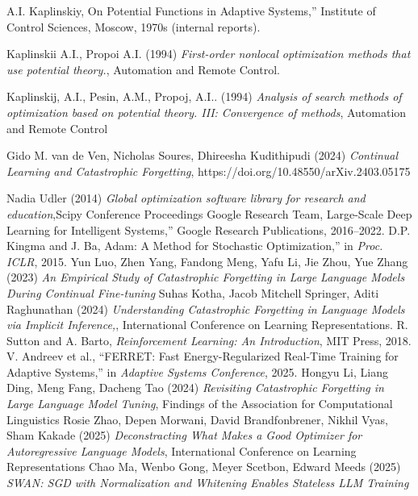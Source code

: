\documentclass[12pt]{article}
\begin{document}
 \begin{thebibliography}{9}

 A.I. Kaplinskiy, On Potential Functions in Adaptive Systems,'' Institute of Control Sciences, Moscow, 1970s (internal reports).


Kaplinskii A.I., Propoi A.I. (1994) \emph{First-order nonlocal optimization methods that use potential theory.}, Automation and Remote Control. 

Kaplinskij, A.I., Pesin, A.M., Propoj, A.I.. (1994) \emph{  Analysis of search methods of optimization based on potential theory. III: Convergence of methods}, Automation and Remote Control

Gido M. van de Ven, Nicholas Soures, Dhireesha Kudithipudi (2024)  \emph{  Continual Learning and Catastrophic Forgetting},
https://doi.org/10.48550/arXiv.2403.05175

Nadia Udler (2014) \emph{ Global optimization software library for research and education},Scipy Conference Proceedings
 Google Research Team, Large-Scale Deep Learning for Intelligent Systems,'' Google Research Publications, 2016--2022.
 D.P. Kingma and J. Ba, Adam: A Method for Stochastic Optimization,'' in \emph{Proc. ICLR}, 2015.
 Yun Luo, Zhen Yang, Fandong Meng, Yafu Li, Jie Zhou, Yue Zhang (2023) \emph{An Empirical Study of Catastrophic Forgetting in Large Language Models During Continual Fine-tuning}
  Suhas Kotha, Jacob Mitchell Springer, Aditi Raghunathan (2024) \emph{Understanding Catastrophic Forgetting in Language Models via Implicit Inference,},  International Conference on Learning Representations.
 R. Sutton and A. Barto, \emph{Reinforcement Learning: An Introduction}, MIT Press, 2018.
 V. Andreev et al., ``FERRET: Fast Energy-Regularized Real-Time Training for Adaptive Systems,'' in \emph{Adaptive Systems Conference}, 2025.
 Hongyu Li, Liang Ding, Meng Fang, Dacheng Tao  (2024)  \emph{ Revisiting Catastrophic Forgetting in Large Language Model Tuning}, Findings of the Association for Computational Linguistics
 Rosie Zhao, Depen Morwani, David Brandfonbrener, Nikhil Vyas, Sham Kakade (2025) \emph{Deconstracting What Makes a Good Optimizer for Autoregressive Language Models}, International Conference on Learning Representations
 Chao Ma, Wenbo Gong, Meyer Scetbon, Edward Meeds (2025) \emph{SWAN: SGD with Normalization and Whitening Enables Stateless LLM Training}


\end{thebibliography}
\end{document}
